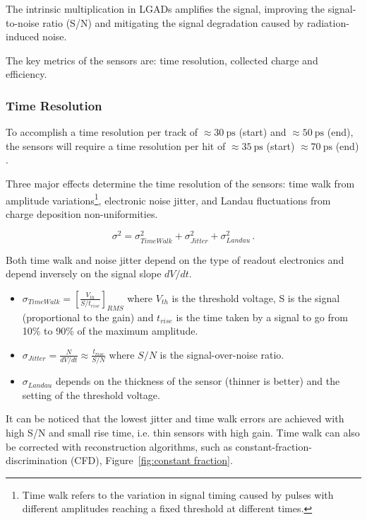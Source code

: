 The intrinsic multiplication in LGADs amplifies the signal, improving the signal-to-noise ratio (S/N) and mitigating the signal degradation caused by radiation-induced noise.

The key metrics of the sensors are: time resolution, collected charge and efficiency.

\subsubsection{Time Resolution}

To accomplish a time resolution per track of \(\approx\qty{30}{\pico\second}\) (start) and \(\approx\qty{50}{\pico\second}\) (end), the sensors will require a time resolution per hit of \(\approx\qty{35}{\pico\second}\) (start) \(\approx\qty{70}{\pico\second}\) (end) \cite{CERN-LHCC-2020-007}.

Three major effects determine the time resolution of the sensors: time walk from amplitude variations\footnote{Time walk refers to the variation in signal timing caused by pulses with different amplitudes reaching a fixed threshold at different times.}, electronic noise jitter, and Landau fluctuations from charge deposition non-uniformities. 

\begin{equation}\label{eq:time_resoltuion_LGADs}
    \sigma^2 = \sigma_{TimeWalk}^2 + \sigma_{Jitter}^2 + \sigma_{Landau}^2  \, .
\end{equation}

 Both time walk and noise jitter depend on the type of readout electronics and depend inversely on the signal slope \(dV/dt\).

\begin{itemize}
    \item \(\sigma_{TimeWalk} = \left[ \frac{V_{th}}{S/t_{rise}}\right]_{RMS}\) where \(V_{th}\) is the threshold voltage, S is the signal (proportional to the gain) and \(t_{rise}\) is the time taken by a signal to go from 10\% to 90\% of the maximum amplitude.
    \item \(\sigma_{Jitter} = \frac{N}{dV/dt} \approx \frac{t_{rise}}{S/N}\) where \(S/N\) is the signal-over-noise ratio.
    \item \(\sigma_{Landau}\) depends on the thickness of the sensor (thinner is better) and the setting of the threshold voltage.
\end{itemize}

It can be noticed that the lowest jitter and time walk errors are achieved with high S/N and small rise time, i.e. thin sensors with high gain. Time walk can also be corrected with reconstruction algorithms, such as constant-fraction-discrimination (CFD), Figure~\ref{fig:constant fraction}.

